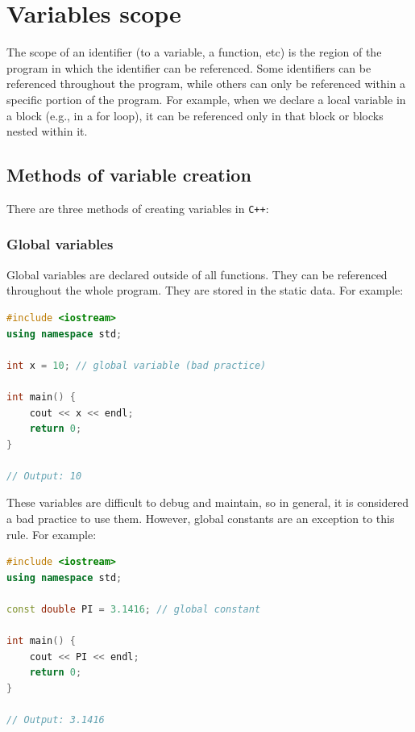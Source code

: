 \section{Variables scope}

The scope of an identifier (to a variable, a function, etc) is the region of the program in which the identifier
can be referenced. Some identifiers can be referenced throughout the program, while others can only be referenced
within a specific portion of the program. For example, when we declare a local variable in a block (e.g., in a for loop),
it can be referenced only in that block or blocks nested within it.

\subsection{Methods of variable creation}

There are three methods of creating variables in \texttt{C++}:

\subsubsection{Global variables}

Global variables are declared outside of all functions. They can be referenced throughout the whole program. They are
stored in the static data. For example:\\

\begin{lstlisting}[language=C++]
#include <iostream>
using namespace std;

int x = 10; // global variable (bad practice)

int main() {
    cout << x << endl;
    return 0;
}

// Output: 10
\end{lstlisting}

These variables are difficult to debug and maintain, so in general, it is considered a bad practice to use them.
However, global constants are an exception to this rule. For example:\\

\begin{lstlisting}[language=C++]
#include <iostream>
using namespace std;

const double PI = 3.1416; // global constant

int main() {
    cout << PI << endl;
    return 0;
}

// Output: 3.1416
\end{lstlisting}


